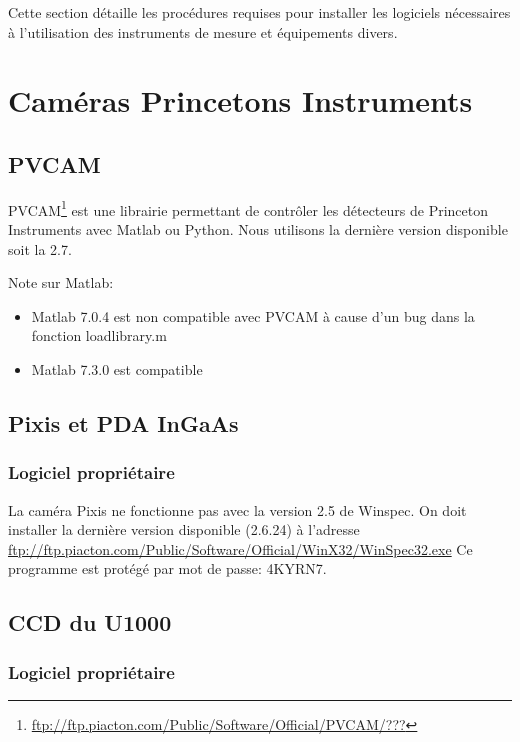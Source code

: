 \documentclass[11pt,francais]{book} %
\begin{document}
Cette section détaille les procédures requises pour installer les logiciels nécessaires à l'utilisation des instruments de mesure et équipements divers.

\section{Caméras Princetons Instruments}

\subsection{PVCAM}

PVCAM\footnote{\url{ftp://ftp.piacton.com/Public/Software/Official/PVCAM/???}} est une librairie permettant de contrôler les détecteurs de Princeton Instruments avec Matlab ou Python.
Nous utilisons la dernière version disponible soit la 2.7.

Note sur Matlab:
\begin{itemize}
\item Matlab 7.0.4 est non compatible avec PVCAM à cause d'un bug dans la fonction loadlibrary.m 
\item Matlab 7.3.0 est compatible
\end{itemize}



\subsection{Pixis et PDA InGaAs}

\subsubsection{Logiciel propriétaire}

La caméra Pixis ne fonctionne pas avec la version 2.5 de Winspec.
On doit installer la dernière version disponible (2.6.24) à l'adresse \url{ftp://ftp.piacton.com/Public/Software/Official/WinX32/WinSpec32.exe}
Ce programme est protégé par mot de passe: 4KYRN7.

\subsection{CCD du U1000}

\subsubsection{Logiciel propriétaire}
\end{document}
